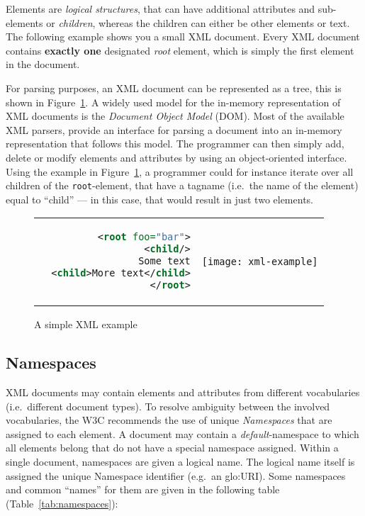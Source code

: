 Elements   are  \emph{logical  structures},   that  can   have  additional
attributes and  sub-elements or \emph{children}, whereas  the children can
either be other elements or text.  The following example shows you a small
XML document. Every XML  document contains \textbf{exactly one} designated
\emph{root} element, which is simply the first element in the document.

For parsing purposes,  an XML document can be represented  as a tree, this
is  shown in Figure~\ref{fig:xml-example}.   A widely  used model  for the
in-memory  representation of  XML documents  is the  \emph{Document Object
  Model} (DOM).  Most  of the available XML parsers,  provide an interface
for parsing a document into  an in-memory representation that follows this
model. The programmer  can then simply add, delete  or modify elements and
attributes by  using an object-oriented  interface.  Using the  example in
Figure~\ref{fig:xml-example}, a programmer could for instance iterate over
all children  of the \texttt{root}-element, that have  a tagname (i.e.~the
name  of the  element) equal  to ``child''  --- in  this case,  that would
result in just two elements.

\begin{figure}[h]
  \centering
  \begin{tabular}{rc}
    \begin{minipage}[c]{.35\textwidth}
      \begin{lstlisting}[language=XML]
<root foo="bar">
  <child/>
  Some text
  <child>More text</child>
</root>
      \end{lstlisting}%
    \end{minipage} &
    \begin{minipage}[c]{.35\textwidth}
      \texttt{[image: xml-example]}
    \end{minipage}
  \end{tabular}
  \caption{A simple XML example}
  \label{fig:xml-example}
\end{figure}

\subsection{Namespaces}

XML  documents   may  contain  elements  and   attributes  from  different
vocabularies (i.e.~different document types). To resolve ambiguity between
the  involved   vocabularies,  the  W3C  recommends  the   use  of  unique
\emph{Namespaces}  that are  assigned  to each  element.   A document  may
contain a  \emph{default}-namespace to which  all elements belong  that do
not  have  a  special  namespace  assigned.   Within  a  single  document,
namespaces are given  a logical name. The logical  name itself is assigned
the unique  Namespace identifier (e.g.~an  \gls{glo:URI}). Some namespaces
and  common  ``names''   for  them  are  given  in   the  following  table
(Table~\ref{tab:namespaces}):

